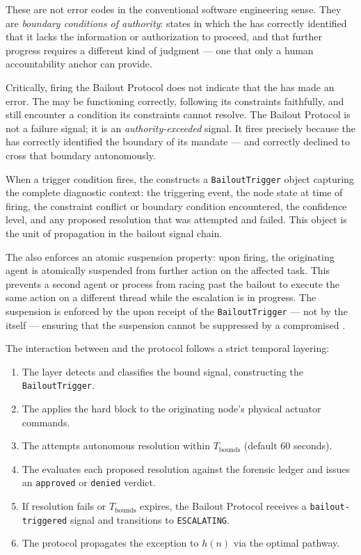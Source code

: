 These are not error codes in the conventional software engineering sense. They are \textit{boundary conditions of authority}: states in which the \bounds{} has correctly identified that it lacks the information or authorization to proceed, and that further progress requires a different kind of judgment — one that only a human accountability anchor can provide.

Critically, firing the Bailout Protocol does not indicate that the \bounds{} has made an error. The \bounds{} may be functioning correctly, following its constraints faithfully, and still encounter a condition its constraints cannot resolve. The Bailout Protocol is not a failure signal; it is an \textit{authority-exceeded} signal. It fires precisely because the \bounds{} has correctly identified the boundary of its mandate — and correctly declined to cross that boundary autonomously.

When a trigger condition fires, the \bounds{} constructs a \texttt{BailoutTrigger} object capturing the complete diagnostic context: the triggering event, the node state at time of firing, the constraint conflict or boundary condition encountered, the \bounds{} confidence level, and any proposed resolution that was attempted and failed. This object is the unit of propagation in the bailout signal chain.

The \bounds{} also enforces an atomic suspension property: upon firing, the originating agent is atomically suspended from further action on the affected task. This prevents a second agent or process from racing past the bailout to execute the same action on a different thread while the escalation is in progress. The suspension is enforced by the \fact{} upon receipt of the \texttt{BailoutTrigger} — not by the \bounds{} itself — ensuring that the suspension cannot be suppressed by a compromised \bounds{}.

The interaction between \bounds{} and the protocol follows a strict temporal layering:

\begin{enumerate}
\item The \bounds{} layer detects and classifies the bound signal, constructing the \texttt{BailoutTrigger}.
\item The \fact{} applies the hard block to the originating node's physical actuator commands.
\item The \bounds{} attempts autonomous resolution within $T_{\text{bounds}}$ (default 60 seconds).
\item The \fact{} evaluates each proposed resolution against the forensic ledger and issues an \texttt{approved} or \texttt{denied} verdict.
\item If resolution fails or $T_{\text{bounds}}$ expires, the Bailout Protocol receives a \texttt{bailout-triggered} signal and transitions to \texttt{ESCALATING}.
\item The protocol propagates the exception to $h(n)$ via the optimal pathway.
\end{enumerate}

